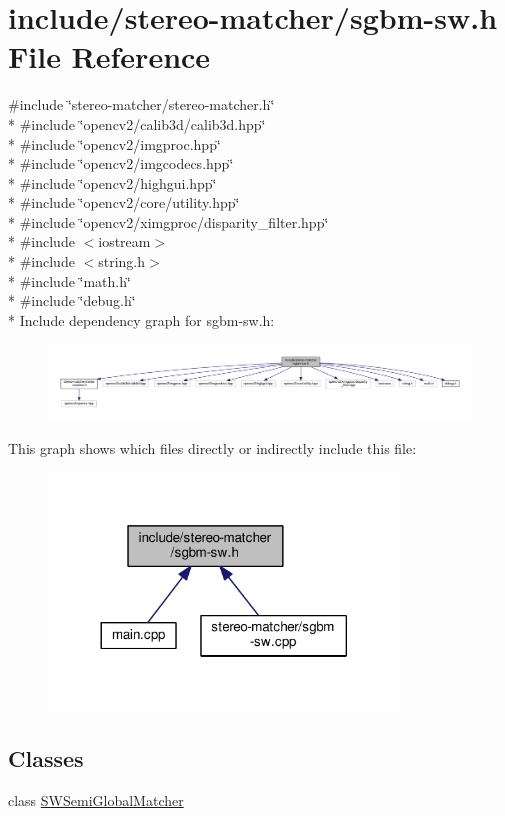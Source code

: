\hypertarget{sgbm-sw_8h}{}\section{include/stereo-\/matcher/sgbm-\/sw.h File Reference}
\label{sgbm-sw_8h}
{\ttfamily \#include \char`\"{}stereo-\/matcher/stereo-\/matcher.\+h\char`\"{}}\\*
{\ttfamily \#include \char`\"{}opencv2/calib3d/calib3d.\+hpp\char`\"{}}\\*
{\ttfamily \#include \char`\"{}opencv2/imgproc.\+hpp\char`\"{}}\\*
{\ttfamily \#include \char`\"{}opencv2/imgcodecs.\+hpp\char`\"{}}\\*
{\ttfamily \#include \char`\"{}opencv2/highgui.\+hpp\char`\"{}}\\*
{\ttfamily \#include \char`\"{}opencv2/core/utility.\+hpp\char`\"{}}\\*
{\ttfamily \#include \char`\"{}opencv2/ximgproc/disparity\+\_\+filter.\+hpp\char`\"{}}\\*
{\ttfamily \#include $<$iostream$>$}\\*
{\ttfamily \#include $<$string.\+h$>$}\\*
{\ttfamily \#include \char`\"{}math.\+h\char`\"{}}\\*
{\ttfamily \#include \char`\"{}debug.\+h\char`\"{}}\\*
Include dependency graph for sgbm-\/sw.h\+:
\nopagebreak
\begin{figure}[H]
\begin{center}
\leavevmode
\includegraphics[width=350pt]{sgbm-sw_8h__incl}
\end{center}
\end{figure}
This graph shows which files directly or indirectly include this file\+:
\nopagebreak
\begin{figure}[H]
\begin{center}
\leavevmode
\includegraphics[width=264pt]{sgbm-sw_8h__dep__incl}
\end{center}
\end{figure}
\subsection*{Classes}
\begin{DoxyCompactItemize}
\item 
class \hyperlink{classSWSemiGlobalMatcher}{S\+W\+Semi\+Global\+Matcher}
\end{DoxyCompactItemize}

